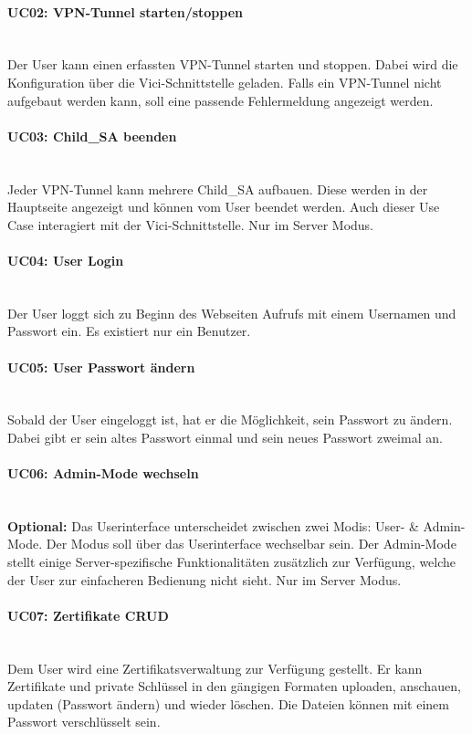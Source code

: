 \paragraph{UC02: VPN-Tunnel starten/stoppen}\mbox{} \\
Der User kann einen erfassten VPN-Tunnel starten und stoppen. Dabei wird die Konfiguration über die Vici-Schnittstelle geladen. Falls ein VPN-Tunnel nicht aufgebaut werden kann, soll eine passende Fehlermeldung angezeigt werden. 

\paragraph{UC03: Child\_SA beenden}\mbox{} \\
Jeder VPN-Tunnel kann mehrere Child\_SA aufbauen. Diese werden in der Hauptseite angezeigt und können vom User beendet werden. Auch dieser Use Case interagiert mit der Vici-Schnittstelle. Nur im Server Modus.

\paragraph{UC04: User Login}\mbox{} \\
Der User loggt sich zu Beginn des Webseiten Aufrufs mit einem Usernamen und Passwort ein. Es existiert nur ein Benutzer.

\paragraph{UC05: User Passwort ändern}\mbox{} \\
Sobald der User eingeloggt ist, hat er die Möglichkeit, sein Passwort zu ändern. Dabei gibt er sein altes Passwort einmal und sein neues Passwort zweimal an.

\paragraph{UC06: Admin-Mode wechseln}\mbox{} \\
\textbf{Optional:} Das Userinterface unterscheidet zwischen zwei Modis: User- \& Admin-Mode. Der Modus soll über das Userinterface wechselbar sein. Der Admin-Mode stellt einige Server-spezifische Funktionalitäten zusätzlich zur Verfügung, welche der User zur einfacheren Bedienung nicht sieht. Nur im Server Modus.

\paragraph{UC07: Zertifikate CRUD}\mbox{} \\
Dem User wird eine Zertifikatsverwaltung zur Verfügung gestellt. Er kann Zertifikate und private Schlüssel in den gängigen Formaten uploaden, anschauen, updaten (Passwort ändern) und wieder löschen. Die Dateien können mit einem Passwort verschlüsselt sein. 

